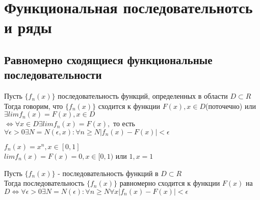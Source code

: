 \chapter{Функциональная последовательнотсь и ряды}

\section{Равномерно сходящиеся функциональные последовательности}

\begin{Def}
	Пусть $\{f_n(x)\}$ последовательность функций, определенных в области $D \subset R$\\
	Тогда говорим, что $\{f_n(x)\}$ сходится к функции $F(x), x \in D$(поточечно) или $\exists lim f_n(x) = F(x), x \in D$\\
	$\Leftrightarrow \forall x \in D \exists lim f_n(x) = F(x),$ то есть $\forall \epsilon > 0 \exists N = N(\epsilon, x) : \forall n \geq N |f_n(x) - F(x)| < \epsilon$\\
\end{Def}

\begin{Example}
	$f_n(x) = x^n, x \in [0, 1]$\\
	$lim f_n(x) = F(x) = 0, x \in [0, 1)$ или $1, x = 1$\\
\end{Example}

\begin{Def}
	Пусть $\{f_n(x)\}$ - последовательность функций в $D \subset R$\\
	Тогда последовательность $\{f_n(x)\}$ равномерно сходится к функции $F(x)$ на $D \Leftrightarrow \forall \epsilon > 0 \exists N = N(\epsilon) : \forall n \geq N \forall x|f_n(x) - F(x)| < \epsilon$\\
\end{Def}
